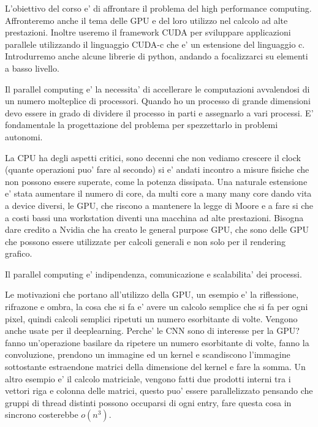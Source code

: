 L'obiettivo del corso e' di affrontare il problema del high performance computing.
Affronteremo anche il tema delle GPU e del loro utilizzo nel calcolo ad alte prestazioni. Inoltre useremo il framework CUDA per sviluppare applicazioni parallele utilizzando il linguaggio CUDA-c che e' un estensione del linguaggio c.
Introdurremo anche alcune librerie di python, andando a focalizzarci su elementi a basso livello.

Il parallel computing e' la necessita' di accellerare le computazioni avvalendosi di un numero molteplice di processori. Quando ho un processo di grande dimensioni devo essere in grado di dividere il processo in parti e assegnarlo a vari processi. E' fondamentale la progettazione del problema per spezzettarlo in problemi autonomi.

La CPU ha degli aspetti critici, sono decenni che non vediamo crescere il clock (quante operazioni puo' fare al secondo) si e' andati incontro a misure fisiche che non possono essere superate, come la potenza dissipata.
Una naturale estensione e' stata aumentare il numero di core, da multi core a many many core dando vita a device diversi, le GPU, che riscono a mantenere la legge di Moore e a fare si che a costi bassi una workstation diventi una macchina ad alte prestazioni. Bisogna dare credito a Nvidia che ha creato le general purpose GPU, che sono delle GPU che possono essere utilizzate per calcoli generali e non solo per il rendering grafico.

Il parallel computing e' indipendenza, comunicazione e scalabilita' dei processi.

Le motivazioni che portano all'utilizzo della GPU, un esempio e' la riflessione, rifrazone e ombra, la cosa che si fa e' avere un calcolo semplice che si fa per ogni pixel, quindi calcoli semplici ripetuti un numero esorbitante di volte.
Vengono anche usate per il deeplearning. Perche' le CNN sono di interesse per la GPU? fanno un'operazione basilare da ripetere un numero esorbitante di volte, fanno la convoluzione, prendono un immagine ed un kernel e scandiscono l'immagine sottostante estraendone matrici della dimensione del kernel e fare la somma.
Un altro esempio e' il calcolo matriciale, vengono fatti due prodotti interni tra i vettori riga e colonna delle matrici, questo puo' essere parallelizzato pensando che gruppi di thread distinti possono occuparsi di ogni entry, fare questa cosa in sincrono costerebbe $o(n^3)$.

